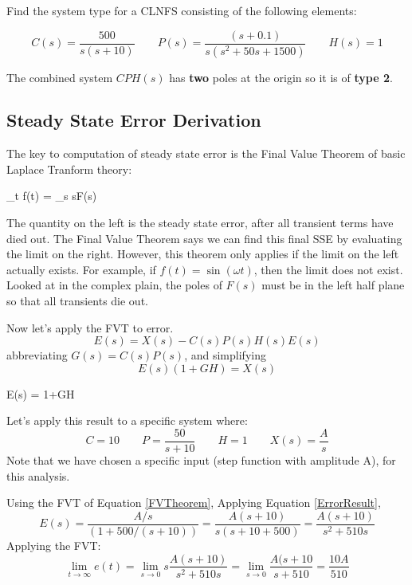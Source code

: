 
\begin{ExampleSmall}
Find the system type for a CLNFS consisting of the following elements:


 \[
 C(s) = \frac{500}{s(s+10)} \qquad P(s) = \frac{(s+0.1)}{s(s^2+50s+1500)} \qquad H(s) = 1
 \]
 
 \vspace{0.25in}
 
The combined system $CPH(s)$ has {\bf two} poles at the origin so it is of {\bf type 2}.
\end{ExampleSmall}

 






\subsection{Steady State Error Derivation}

The key to computation of steady state error is the Final Value Theorem of basic Laplace Tranform theory:

\bq\label{FVTheorem}
\lim_{t\to\infty} f(t) = \lim_{s} sF(s)
\eq

The quantity on the left is the steady state error, after all transient terms have died out.   The Final Value Theorem says we can find this final SSE by evaluating the limit on the right.  However, this theorem only applies if the limit on the left actually exists.  For example, if $f(t) = \sin(\omega t)$, then the limit does not exist.  Looked at in the complex plain, the poles of $F(s)$ must be in the left half plane so that all transients die out. 

Now let's apply the FVT to error.
\[
E(s) = X(s) - C(s)P(s)H(s)E(s)
\]
abbreviating $G(s) = C(s)P(s)$, and simplifying
\[
E(s) \left( 1+GH \right) = X(s)
\]

\bq\label{ErrorResult}
E(s) =  {1+GH}  
\eq

Let's apply this result to a specific system where:
\[
C = 10 \qquad P = \frac{50}{s+10} \qquad H = 1 \qquad X(s) = \frac{A}{s}
\]
Note that we have chosen a specific input (step function with amplitude A), for this analysis. 

Using the FVT of Equation \ref{FVTheorem},  Applying Equation \ref{ErrorResult},
\[
E(s) = \frac{A/s}{(1+500/(s+10))} = \frac{A(s+10)}{s(s+10+500)}= \frac{A(s+10)}{s^2+510s} 
\]
Applying the FVT:
\[
\lim_{t\to\infty} e(t) = \lim_{s\to 0} s\frac{A(s+10)}{s^2+510s} = \lim_{s\to 0} \frac{A(s+10}{s+510} = \frac{10A}{510}
\]

